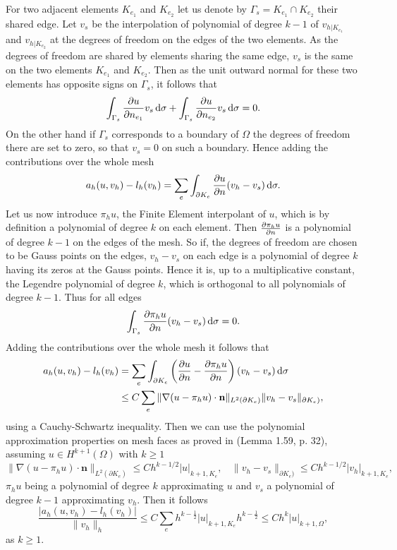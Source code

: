 For two adjacent elements  $K_{e_1}$ and $K_{e_2}$ let us denote by $\Gamma_s=  K_{e_1}\cap K_{e_2}$ their shared edge.
Let  $v_s$ be the interpolation of polynomial of degree $k-1$ of $v_{h|K_{e_1}}$ and $v_{h|K_{e_2}}$ at the degrees of freedom on the edges of the two elements. As the degrees of freedom are shared by elements sharing the same edge, $v_s$ is the same on the two elements $K_{e_1}$ and
$K_{e_2}$. Then as the unit outward normal for these two elements has opposite signs on $\Gamma_s$, it follows that
$$ \int_{\Gamma_s} \frac{\partial u}{\partial n_{e_1}} v_s \,{\rm d} \sigma + \int_{\Gamma_s} \frac{\partial u}{\partial n_{e_2}} v_s \,{\rm d} \sigma=0.$$
On the other hand if $\Gamma_s$ corresponds to a boundary of $\Omega$ the degrees of freedom there are set to zero, so that $v_s=0$ on such a boundary.
Hence adding the contributions over the whole mesh
$$a_h(u,v_h)-l_h(v_h) =  \sum_e \int_{\partial{K_e}} \frac{\partial u}{\partial n} (v_h-v_s) \,{\rm d} \sigma. $$
Let us now introduce $\pi_h u$, the Finite Element interpolant of $u$, which is by definition a polynomial of degree $k$ on each element. Then $ \frac{\partial \pi_h u}{\partial n} $ is a polynomial of degree $k-1$ on the edges of the mesh. So if, the degrees of freedom are chosen to be Gauss points on the edges,
$v_h-v_s$ on each edge is a polynomial of degree $k$ having its zeros at the Gauss points. Hence it is, up to a multiplicative constant, the Legendre polynomial of degree $k$, which is orthogonal to all polynomials of degree $k-1$. Thus for all edges
$$ \int_{\Gamma_s} \frac{\partial \pi_h u}{\partial n} (v_h-v_s) \,{\rm d} \sigma = 0.$$
Adding the contributions over the whole mesh it follows that
\begin{align*}
a_h(u,v_h)-l_h(v_h) &=  \sum_e \int_{\partial{K_e}} \left(\frac{\partial u}{\partial n}-\frac{\partial \pi_h u}{\partial n}\right)  (v_h-v_s) \,{\rm d} \sigma \\
&\leq C \sum_e \|\nabla (u-\pi_h u)\cdot \mathbf{n}\|_{L^2(\partial{K_e})} \| v_h-v_s \|_{\partial{K_e})},
\end{align*}
using a Cauchy-Schwartz inequality. Then we can use the polynomial approximation properties on mesh faces as proved in \cite{dipietro2012} (Lemma 1.59, p. 32), assuming $u\in H^{k+1}(\Omega)$ with $k\geq 1$
\begin{equation}\label{eq:pol_approx_edge}
 \|\nabla (u-\pi_h u)\cdot \mathbf{n}\|_{L^2(\partial{K_e})}  \leq C h^{k-1/2} |u|_{k+1,K_e}, ~~~~
  \| v_h-v_s \|_{\partial{K_e})} \leq C h^{k-1/2} |v_h|_{k+1,K_e}, 
\end{equation}
$\pi_h u$ being a polynomial of degree $k$ approximating $u$ and $v_s$ a polynomial of degree $k-1$ approximating $v_h$.
Then it follows 
$$\frac{|a_h(u,v_h)-l_h(v_h) |}{\|v_h\|_h} \leq C  \sum_e h^{k-\frac 12} |u|_{k+1,K_e} h^{k-\frac 12} \leq C h^k |u|_{k+1,\Omega},$$
as $k\geq 1$.


